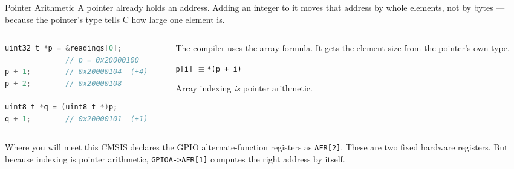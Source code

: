 \documentclass[9pt,aspectratio=169,xcolor=table]{beamer}
\begin{document}
\begin{frame}[fragile]{Pointer Arithmetic}
    \leavevmode
    A pointer already holds an address. Adding an integer to it moves that
    address by \alert{whole elements}, not by bytes --- because the
    pointer's type tells C how large one element is.

    \vspace{2mm}
    \begin{columns}[T]
    \begin{column}{.5\textwidth}
\begin{lstlisting}[language=C, basicstyle=\ttfamily\footnotesize]
uint32_t *p = &readings[0];
              // p = 0x20000100
p + 1;        // 0x20000104  (+4)
p + 2;        // 0x20000108

uint8_t *q = (uint8_t *)p;
q + 1;        // 0x20000101  (+1)
\end{lstlisting}
    \end{column}
    \begin{column}{.46\textwidth}
        The compiler uses the array formula. It gets the element size
        from the \alert{pointer's own type}.

        \vspace{3mm}
        \begin{center}
        \texttt{p[i]} \quad$\equiv$\quad \texttt{*(p + i)}
        \end{center}

        \vspace{2mm}
        {\small Array indexing \emph{is} pointer arithmetic.}
    \end{column}
    \end{columns}

    \vspace{2mm}
    \begin{block}{Where you will meet this}
        CMSIS declares the GPIO alternate-function registers as
        \texttt{AFR[2]}. These are two fixed hardware registers. But
        because indexing is pointer arithmetic, \texttt{GPIOA->AFR[1]}
        computes the right address by itself.
    \end{block}
\end{frame}
\end{document}
